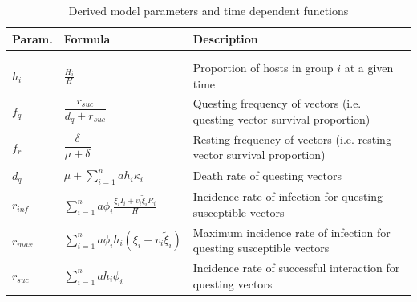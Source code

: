 \documentclass[a4paper]{article}
\newcommand{\dsum}{\displaystyle\sum}
\newcommand{\fiVar }{\phi_{i} }
\newcommand{\kiVar }{\kappa_{i} }
\newcommand{\biVar }{h_{i} }
\begin{document}
\begin{table}[htbp]
\caption{Derived model parameters and time dependent functions}\label{tab.tabvd2}


\begin{tabular}{p{0.78cm}p{2.8cm}p{13.5cm}}
\hline
Param. &  Formula &  Description  \\
\hline
\\\\$h_i $ & $\frac{H_i}{H}$ &Proportion of hosts in group $i$ at a given time
\\$f_q$ & $\dfrac{r_{suc}}{d_q+r_{suc}}$ & Questing frequency of vectors (i.e. questing vector survival proportion) 
\\$f_r$ & $\dfrac{\delta}{\mu+\delta}$ & Resting frequency of vectors  (i.e. resting vector survival proportion)
\\$d_q$ & $\mu + \dsum_{i=1}^nah_i \kappa_i$ & Death rate of questing vectors
\\ $r_{inf}$ & ${\dsum_{i=1}^n} a \phi_i \frac{\xi_iI_i+v_i\widetilde\xi_iR_i}{H}$ &  Incidence rate of infection for questing susceptible vectors
\\ $r_{max} $ & ${\dsum_{i=1}^n} a\phi_ih_i(\xi_i+v_i\widetilde\xi_i)$ &  Maximum incidence rate of infection for questing susceptible vectors
\\ $r_{suc}$ & $\dsum_{i=1}^nah_i \phi_i $ & Incidence rate of successful interaction for questing vectors
\\
\hline
\end{tabular}
\end{table}
\end{document}
